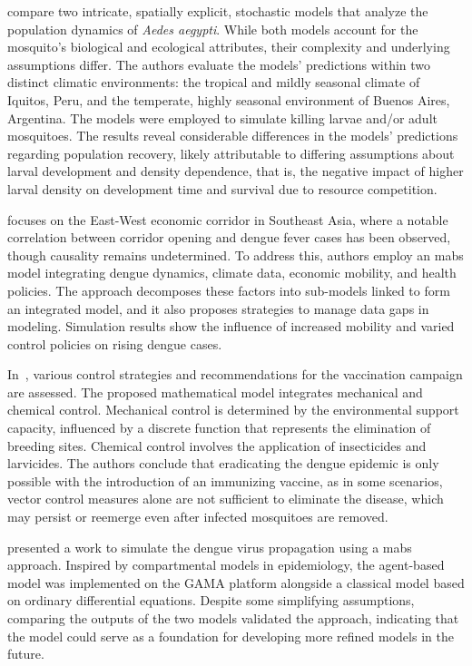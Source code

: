 \cite{Legros2016} compare two intricate, spatially explicit, stochastic models
that analyze the population dynamics of \textit{Aedes aegypti}. While both
models account for the mosquito's biological and ecological attributes, their
complexity and underlying assumptions differ. The authors evaluate the models’
predictions within two distinct climatic environments: the tropical and mildly
seasonal climate of Iquitos, Peru, and the temperate, highly seasonal
environment of Buenos Aires, Argentina. The models were employed to simulate
killing larvae and/or adult mosquitoes. The results reveal considerable
differences in the models' predictions regarding population recovery, likely
attributable to differing assumptions about larval development and density
dependence, that is, the negative impact of higher larval density on
development time and survival due to resource competition.

\cite{damien:2017} focuses on the East-West economic corridor in Southeast
Asia, where a notable correlation between corridor opening and dengue fever
cases has been observed, though causality remains undetermined. To address this,
authors employ an \gls{mabs} model integrating dengue dynamics, climate data,
economic mobility, and health policies. The approach decomposes these factors
into sub-models linked to form an integrated model, and it also proposes
strategies to manage data gaps in modeling. Simulation results show the
influence of increased mobility and varied control policies on rising dengue
cases.

In~\cite{Carvalho2019}, various control strategies and recommendations for the
vaccination campaign are assessed. The proposed mathematical model integrates
mechanical and chemical control. Mechanical control is determined by the
environmental support capacity, influenced by a discrete function that
represents the elimination of breeding sites. Chemical control involves the
application of insecticides and larvicides. The authors conclude that
eradicating the dengue epidemic is only possible with the introduction of an
immunizing vaccine, as in some scenarios, vector control measures alone are not
sufficient to eliminate the disease, which may persist or reemerge even after
infected mosquitoes are removed.


\cite{da-silva:2020} presented a work to simulate the dengue virus propagation
using a \gls{mabs} approach. Inspired by compartmental models in epidemiology,
the agent-based model was implemented on the GAMA platform alongside a classical
model based on ordinary differential equations. Despite some simplifying
assumptions, comparing the outputs of the two models validated the approach,
indicating that the model could serve as a foundation for developing more
refined models in the future.

